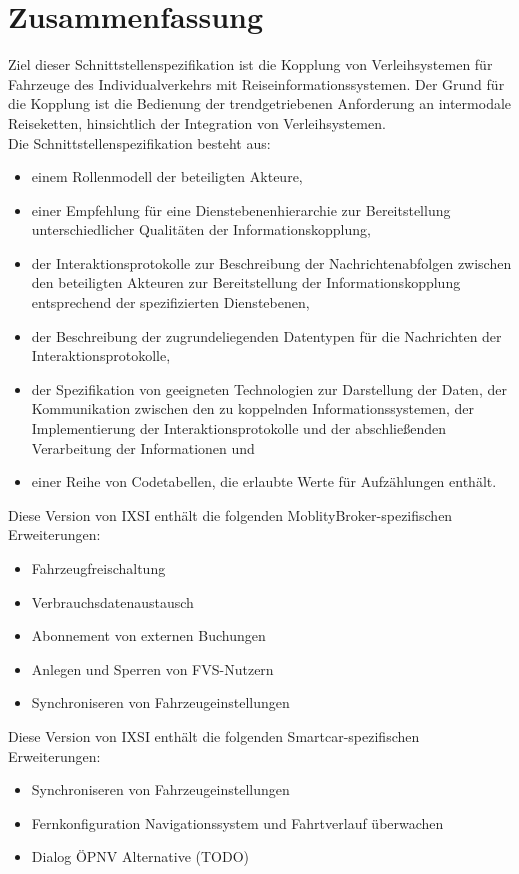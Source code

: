 \chapter{Zusammenfassung}
\label{cha:Zusammenfassung}

Ziel dieser Schnittstellenspezifikation ist die Kopplung von Verleihsystemen für Fahrzeuge des Individualverkehrs mit Reiseinformationssystemen. Der Grund für die Kopplung ist die Bedienung der trendgetriebenen Anforderung an intermodale Reiseketten,  hinsichtlich der Integration von Verleihsystemen.\\

Die Schnittstellenspezifikation besteht aus:\begin{itemize}
\item einem Rollenmodell der beteiligten Akteure,
\item einer Empfehlung für eine Dienstebenenhierarchie zur Bereitstellung unterschiedlicher Qualitäten der Informationskopplung,
\item der Interaktionsprotokolle zur Beschreibung der Nachrichtenabfolgen zwischen den beteiligten Akteuren zur Bereitstellung der Informationskopplung entsprechend der spezifizierten Dienstebenen,
\item der Beschreibung der zugrundeliegenden Datentypen für die Nachrichten der Interaktionsprotokolle,
\item der Spezifikation von geeigneten Technologien zur Darstellung der Daten, der Kommunikation zwischen den zu koppelnden Informationssystemen, der Implementierung der Interaktionsprotokolle und der abschließenden Verarbeitung der Informationen und
\item einer Reihe von Codetabellen, die erlaubte Werte für Aufzählungen enthält.
\end{itemize}
\bigskip
Diese Version von IXSI enthält die folgenden MoblityBroker-spezifischen Erweiterungen:
\begin{itemize}
\item Fahrzeugfreischaltung
\item Verbrauchsdatenaustausch
\item Abonnement von externen Buchungen
\item Anlegen und Sperren von FVS-Nutzern
\item Synchroniseren von Fahrzeugeinstellungen
\end{itemize}
Diese Version von IXSI enthält die folgenden Smartcar-spezifischen Erweiterungen:
\begin{itemize}
\item Synchroniseren von Fahrzeugeinstellungen
\item Fernkonfiguration Navigationssystem und Fahrtverlauf überwachen
\item Dialog ÖPNV Alternative (TODO)
\end{itemize}

